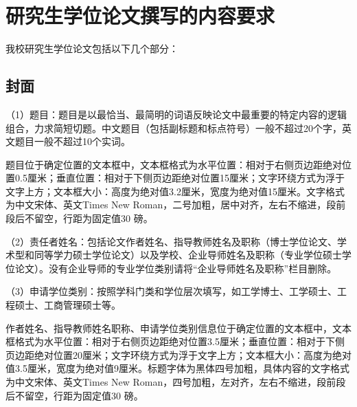 \chapter{研究生学位论文撰写的内容要求}
我校研究生学位论文包括以下几个部分：
\section{封面}
（1）题目：题目是以最恰当、最简明的词语反映论文中最重要的特定内容的逻辑组合，力求简短切题。中文题目（包括副标题和标点符号）一般不超过20个字，英文题目一般不超过10个实词。
\par
题目位于确定位置的文本框中，文本框格式为水平位置：相对于右侧页边距绝对位置0.5厘米；垂直位置：相对于下侧页边距绝对位置15厘米；文字环绕方式为浮于文字上方；文本框大小：高度为绝对值3.2厘米，宽度为绝对值15厘米。文字格式为中文宋体、英文Times New Roman，二号加粗，居中对齐，左右不缩进，段前段后不留空，行距为固定值30 磅。
\par
（2）责任者姓名：包括论文作者姓名、指导教师姓名及职称（博士学位论文、学术型和同等学力硕士学位论文）以及学校、企业导师姓名及职称（专业学位硕士学位论文）。没有企业导师的专业学位类别请将“企业导师姓名及职称”栏目删除。
\par
（3）申请学位类别：按照学科门类和学位层次填写，如工学博士、工学硕士、工程硕士、工商管理硕士等。
\par
作者姓名、指导教师姓名职称、申请学位类别信息位于确定位置的文本框中，文本框格式为水平位置：相对于右侧页边距绝对位置3.5厘米；垂直位置：相对于下侧页边距绝对位置20厘米；文字环绕方式为浮于文字上方；文本框大小：高度为绝对值3.5厘米，宽度为绝对值9厘米。标题字体为黑体四号加粗，具体内容的文字格式为中文宋体、英文Times New Roman，四号加粗，左对齐，左右不缩进，段前段后不留空，行距为固定值30 磅。
